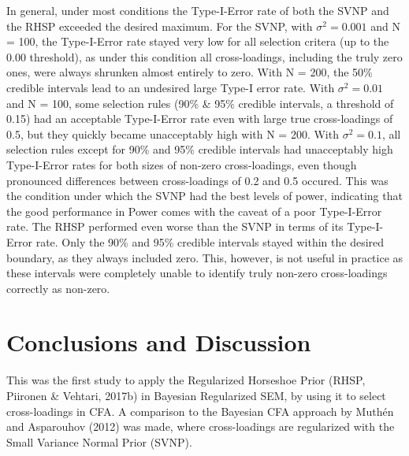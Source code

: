 \documentclass[
  man, donotrepeattitle,floatsintext]{apa6}
\begin{document}
In general, under most conditions the Type-I-Error rate of both the SVNP and the RHSP exceeded the desired maximum. For the SVNP, with \(\sigma^2 = 0.001\) and N = 100, the Type-I-Error rate stayed very low for all selection critera (up to the 0.00 threshold), as under this condition all cross-loadings, including the truly zero ones, were always shrunken almost entirely to zero. With N = 200, the 50\% credible intervals lead to an undesired large Type-I error rate. With \(\sigma^2 = 0.01\) and N = 100, some selection rules (90\% \& 95\% credible intervals, a threshold of 0.15) had an acceptable Type-I-Error rate even with large true cross-loadings of 0.5, but they quickly became unacceptably high with N = 200. With \(\sigma^2 = 0.1\), all selection rules except for 90\% and 95\% credible intervals had unacceptably high Type-I-Error rates for both sizes of non-zero cross-loadings, even though pronounced differences between cross-loadings of 0.2 and 0.5 occured. This was the condition under which the SVNP had the best levels of power, indicating that the good performance in Power comes with the caveat of a poor Type-I-Error rate. The RHSP performed even worse than the SVNP in terms of its Type-I-Error rate. Only the 90\% and 95\% credible intervals stayed within the desired boundary, as they always included zero. This, however, is not useful in practice as these intervals were completely unable to identify truly non-zero cross-loadings correctly as non-zero.

\hypertarget{conclusions-and-discussion}{%
\section{Conclusions and Discussion}\label{conclusions-and-discussion}}

This was the first study to apply the Regularized Horseshoe Prior (RHSP, Piironen \& Vehtari, 2017b) in Bayesian Regularized SEM, by using it to select cross-loadings in CFA. A comparison to the Bayesian CFA approach by Muthén and Asparouhov (2012) was made, where cross-loadings are regularized with the Small Variance Normal Prior (SVNP).
\end{document}
